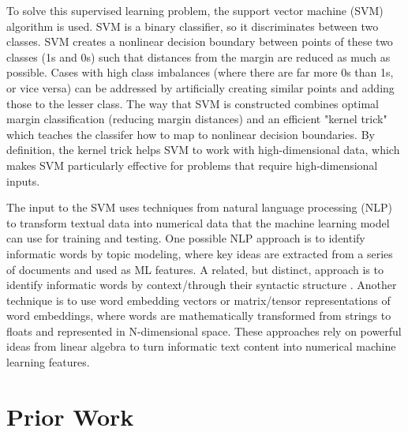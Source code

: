 \documentclass[10pt,twocolumn]{article}
\begin{document}
To solve this supervised learning problem, the support vector machine (SVM) algorithm is used. SVM is a binary classifier, so it discriminates between two classes. SVM creates a nonlinear decision boundary between points of these two classes (1s and 0s) such that distances from the margin are reduced as much as possible. \cite{CortesVapnikSVM} Cases with high class imbalances (where there are far more 0s than 1s, or vice versa) can be addressed by artificially creating similar points and adding those to the lesser class. \cite{NVChawla} The way that SVM is constructed combines optimal margin classification (reducing margin distances) and an efficient "kernel trick" which teaches the classifer how to map to nonlinear decision boundaries. By definition, the kernel trick helps SVM to work with high-dimensional data, which makes SVM particularly effective for problems that require high-dimensional inputs. \cite{Joachims, Berbatova} 

The input to the SVM uses techniques from natural language processing (NLP) to transform textual data into numerical data that the machine learning model can use for training and testing. One possible NLP approach is to identify informatic words by topic modeling, where key ideas are extracted from a series of documents and used as ML features. \cite{Ryan_51, Reuver} A related, but distinct, approach is to identify informatic words by context/through their syntactic structure \cite{Meidl, LDiCaro}. Another technique is to use word embedding vectors or matrix/tensor representations of word embeddings, where words are mathematically transformed from strings to floats and represented in N-dimensional space. \cite{Sifa_tensor} These approaches rely on powerful ideas from linear algebra to turn informatic text content into numerical machine learning features.

\section{Prior Work}

\end{document}
